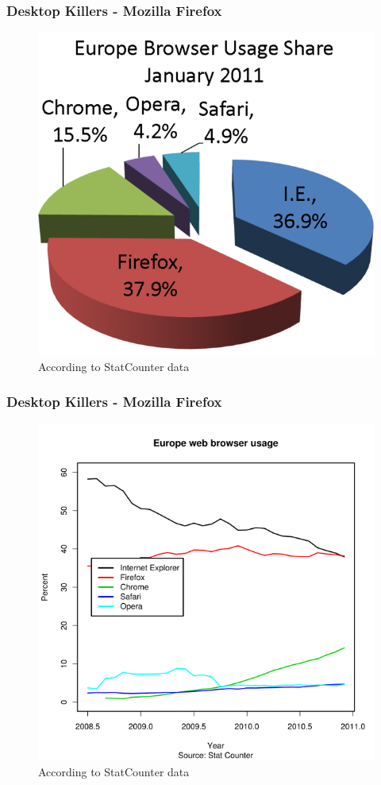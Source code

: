 \documentclass{beamer}
\begin{document}
\begin{frame}
\frametitle{Desktop Killers - Mozilla Firefox}
\begin{figure}
 \includegraphics[scale=0.55]{figs/stats1}
 \caption {According to StatCounter data }
\end{figure}
\end{frame}


\begin{frame}
\frametitle{Desktop Killers - Mozilla Firefox}
\begin{figure}
 \includegraphics[scale=0.30]{figs/stats2}
 \caption {According to StatCounter data }
\end{figure}
\end{frame}
\end{document}
